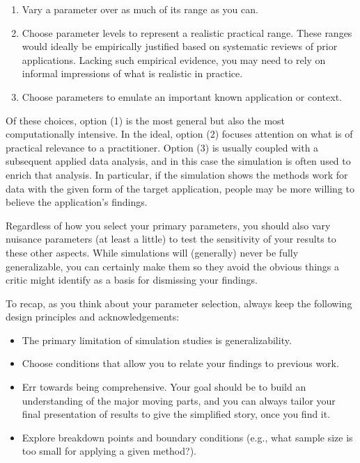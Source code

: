 \documentclass[
]{book}
\providecommand{\tightlist}{%
  \setlength{\itemsep}{0pt}\setlength{\parskip}{0pt}}
\begin{document}
\begin{enumerate}
\def\labelenumi{\arabic{enumi}.}
\tightlist
\item
  Vary a parameter over as much of its range as you can.
\item
  Choose parameter levels to represent a realistic practical range. These ranges would ideally be empirically justified based on systematic reviews of prior applications. Lacking such empirical evidence, you may need to rely on informal impressions of what is realistic in practice.
\item
  Choose parameters to emulate an important known application or context.
\end{enumerate}

Of these choices, option (1) is the most general but also the most computationally intensive.
In the ideal, option (2) focuses attention on what is of practical relevance to a practitioner.
Option (3) is usually coupled with a subsequent applied data analysis, and in this case the simulation is often used to enrich that analysis.
In particular, if the simulation shows the methods work for data with the given form of the target application, people may be more willing to believe the application's findings.

Regardless of how you select your primary parameters, you should also vary nuisance parameters (at least a little) to test the sensitivity of your results to these other aspects.
While simulations will (generally) never be fully generalizable, you can certainly make them so they avoid the obvious things a critic might identify as a basis for dismissing your findings.

To recap, as you think about your parameter selection, always keep the following design principles and acknowledgements:

\begin{itemize}
\tightlist
\item
  The primary limitation of simulation studies is generalizability.
\item
  Choose conditions that allow you to relate your findings to previous work.
\item
  Err towards being comprehensive. Your goal should be to build an understanding of the major moving parts, and you can always tailor your final presentation of results to give the simplified story, once you find it.
\item
  Explore breakdown points and boundary conditions (e.g., what sample size is too small for applying a given method?).
\end{itemize}
\end{document}
